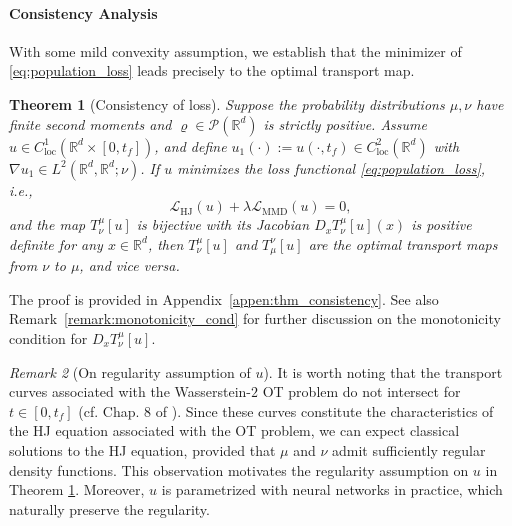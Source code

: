 \documentclass{article} %
\theoremstyle{plain}
\newtheorem{theorem}{Theorem}[section]
\theoremstyle{definition}
\theoremstyle{remark}
\newtheorem{remark}[theorem]{Remark}
\begin{document}
\vspace{-0.1cm}
\paragraph{Consistency Analysis} With some mild convexity  assumption, we establish that the minimizer of \eqref{eq:population_loss} leads precisely to the optimal transport map.
\begin{theorem}[Consistency of loss]\label{thm:consistency}
Suppose the probability distributions $\mu, \nu$ have finite second moments and $\varrho\in\mathscr{P}(\mathbb{R}^d)$ is strictly positive. 
Assume $u\in C^1_{\text{loc}}(\mathbb{R}^d\times[0, t_f])$, and define $u_1(\cdot) := u(\cdot, t_f) \in C^2_{\text{loc}}(\mathbb{R}^d)$ with $\nabla u_1 \in L^2(\mathbb{R}^d, \mathbb{R}^d; \nu)$. 
  If $u$ minimizes the loss functional \eqref{eq:population_loss}, i.e., 
  \[\mathcal L_{\text{HJ}}(u) + \lambda \mathcal L_{\text{MMD}}(u) = 0,
  \]
  and the map $T_\nu^\mu[u]$ is bijective
  with its Jacobian $D_x T_\nu^\mu[u](x)$ is positive definite
  for any $x\in\mathbb{R}^d$, then $T_\nu^\mu[u]$ and $T_\mu^\nu[u]$ are the optimal transport maps from $\nu$ to $\mu$, and vice versa.
\end{theorem}
The proof is provided in Appendix~\ref{appen:thm_consistency}. See also Remark~\ref{remark:monotonicity_cond} for further discussion on the monotonicity condition for $D_x T_\nu^\mu[u]$.
\begin{remark}[On regularity assumption of $u$]
It is worth noting that the transport curves associated with the Wasserstein-$2$ OT problem do not intersect for $t \in [0, t_f]$ (cf. Chap. 8 of \citep{villani2008optimal}). Since these curves constitute the characteristics of the HJ equation associated with the OT problem, we can expect classical solutions to the HJ equation, provided that $\mu$ and $\nu$ admit sufficiently regular density functions. This observation motivates the regularity assumption on $u$ in Theorem \ref{thm:consistency}. Moreover, $u$ is parametrized with neural networks in practice, which naturally preserve the regularity.
\end{remark}

\vspace{-0.1cm}
\end{document}
